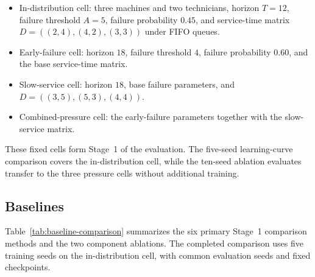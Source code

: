 \documentclass[11pt]{article}
\begin{document}
\begin{itemize}[leftmargin=*]
    \item In-distribution cell: three machines and two technicians, horizon $T=12$, failure threshold $A=5$, failure probability $0.45$, and service-time matrix $D=((2,4),(4,2),(3,3))$ under FIFO queues.
    \item Early-failure cell: horizon $18$, failure threshold $4$, failure probability $0.60$, and the base service-time matrix.
    \item Slow-service cell: horizon $18$, base failure parameters, and $D=((3,5),(5,3),(4,4))$.
    \item Combined-pressure cell: the early-failure parameters together with the slow-service matrix.
\end{itemize}

These fixed cells form Stage~1 of the evaluation. The five-seed learning-curve comparison covers the in-distribution cell, while the ten-seed ablation evaluates transfer to the three pressure cells without additional training.

\subsection{Baselines}

Table~\ref{tab:baseline-comparison} summarizes the six primary Stage~1 comparison methods and the two component ablations. The completed comparison uses five training seeds on the in-distribution cell, with common evaluation seeds and fixed checkpoints.
\end{document}
